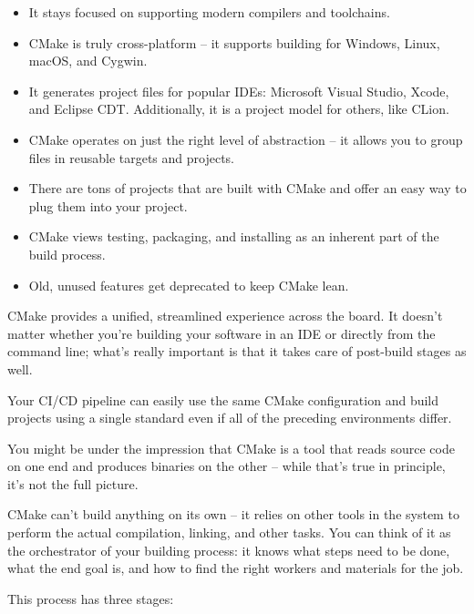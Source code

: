 \begin{itemize}
\item
It stays focused on supporting modern compilers and toolchains.

\item
CMake is truly cross-platform – it supports building for Windows, Linux, macOS, and Cygwin.

\item
It generates project files for popular IDEs: Microsoft Visual Studio, Xcode, and Eclipse CDT. Additionally, it is a project model for others, like CLion.

\item
CMake operates on just the right level of abstraction – it allows you to group files in reusable targets and projects.

\item
There are tons of projects that are built with CMake and offer an easy way to plug them into your project.

\item
CMake views testing, packaging, and installing as an inherent part of the build process.

\item
Old, unused features get deprecated to keep CMake lean.
\end{itemize}

CMake provides a unified, streamlined experience across the board. It doesn’t matter whether you’re building your software in an IDE or directly from the command line; what’s really important is that it takes care of post-build stages as well.

Your CI/CD pipeline can easily use the same CMake configuration and build projects using a single standard even if all of the preceding environments differ.


You might be under the impression that CMake is a tool that reads source code on one end and produces binaries on the other – while that’s true in principle, it’s not the full picture.

CMake can’t build anything on its own – it relies on other tools in the system to perform the actual compilation, linking, and other tasks. You can think of it as the orchestrator of your building process: it knows what steps need to be done, what the end goal is, and how to find the right workers and materials for the job.

This process has three stages:

